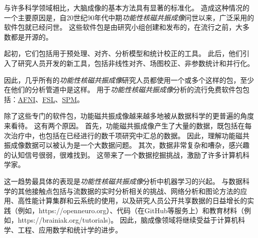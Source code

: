 \begin{proposition}[神经解剖学导航术语] \label{box:6_1}
	
	\quad \quad 与许多科学领域相比，大脑成像的基本方法具有显著的标准化。
	造成这种情况的一个主要原因是，自20世纪90年代中期\textit{功能性核磁共振成像}问世以来，广泛采用的软件包就已经问世。
	这些软件包是由研究小组创建和发布的，在流行之前，大多数都是开源的。
	
	\quad \quad 起初，它们包括用于预处理、对齐、分析模型和统计校正的工具。
	此后，他们引入了研究人员开发的新工具，包括非线性对齐、场图校正、非参数统计和并行化。
	
	\quad \quad 因此，几乎所有的\textit{功能性核磁共振成像}研究人员都使用一个或多个这样的包，至少在他们的分析管道中是这样。
	用于\textit{功能性核磁共振成像}分析的流行免费软件包包括：\href{https://afni.nimh.nih.gov}{AFNI}、\href{https://fsl.fmrib.ox.ac.uk}{FSL}、\href{https://www.fil.ion.ucl.ac.uk/spm}{SPM}。
	
	\quad \quad 除了这些专门的软件包，功能磁共振成像越来越多地被从数据科学的更普遍的角度来看待。
	这有两个原因。
	首先，功能磁共振成像产生了大量的数据，既包括在每次治疗中，也包括在已经进行的数千项研究中汇总的数据。
	因此，理解功能磁共振成像数据可以被认为是一个大数据问题。
	其次，数据非常复杂和嘈杂，感兴趣的认知信号很弱，很难找到。
	这带来了一个数据挖掘挑战，激励了许多计算机科学家。
	
	\quad \quad 这一趋势最具体的表现是\textit{功能性核磁共振成像}分析中机器学习的兴起。
	与数据科学的其他接触点包括与流数据的实时分析相关的挑战、网络分析和图论方法的应用、高性能计算集群和云系统的使用，以及研究人员公开共享数据的日益增长的实践（例如，https://openneuro.org）、代码（在GitHub等服务上）和教育材料（例如，https://brainiak.org/tutorials)。
	因此，脑成像领域将继续受益于计算机科学、工程、应用数学和统计学的进步。
	
\end{proposition}


